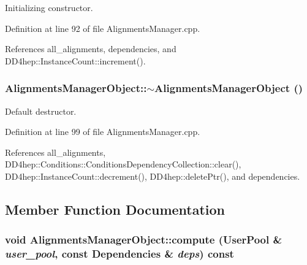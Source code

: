 Initializing constructor. 

Definition at line 92 of file AlignmentsManager.cpp.

References all\_\-alignments, dependencies, and DD4hep::InstanceCount::increment().\hypertarget{class_d_d4hep_1_1_alignments_1_1_alignments_manager_object_a4eb2f5609448d4e70e2cab1b33311f96}{
\subsubsection[{$\sim$AlignmentsManagerObject}]{\setlength{\rightskip}{0pt plus 5cm}AlignmentsManagerObject::$\sim$AlignmentsManagerObject ()}}
\label{class_d_d4hep_1_1_alignments_1_1_alignments_manager_object_a4eb2f5609448d4e70e2cab1b33311f96}


Default destructor. 

Definition at line 99 of file AlignmentsManager.cpp.

References all\_\-alignments, DD4hep::Conditions::ConditionsDependencyCollection::clear(), DD4hep::InstanceCount::decrement(), DD4hep::deletePtr(), and dependencies.

\subsection{Member Function Documentation}
\hypertarget{class_d_d4hep_1_1_alignments_1_1_alignments_manager_object_af1c948318a90348d15de1cf11c1ee5e0}{
\subsubsection[{compute}]{\setlength{\rightskip}{0pt plus 5cm}void AlignmentsManagerObject::compute (UserPool \& {\em user\_\-pool}, \/  const {\bf Dependencies} \& {\em deps}) const}}
\label{class_d_d4hep_1_1_alignments_1_1_alignments_manager_object_af1c948318a90348d15de1cf11c1ee5e0}


